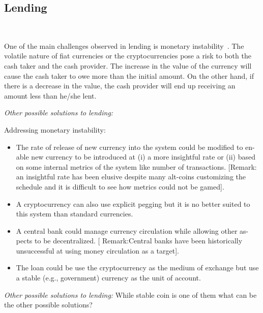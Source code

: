 \subsection{Lending}
~

One of the main challenges observed in lending is  monetary instability~\cite{okoyetoward}. The volatile nature of fiat currencies or the cryptocurrencies pose a risk to both the cash taker and the cash provider. The increase in the value of the currency will cause the cash taker to owe more than the initial amount. On the other hand, if there is a decrease in the value, the cash provider will end up receiving an amount less than he/she lent.



\textit{Other possible solutions to lending:} ~

Addressing monetary instability:
\begin{itemize}
	\item The rate of release of new currency into the system could be modified to en-
	able new currency to be introduced at (i) a more insightful rate or (ii) based
	on some internal metrics of the system like number of transactions. [Remark:
	an insightful rate has been elusive despite many alt-coins customizing the
	schedule and it is difficult to see how metrics could not be gamed].
	\item A cryptocurrency can also use explicit pegging but it is no better suited to this system than standard currencies.
	\item A central bank could manage currency circulation while allowing other as-
	pects to be decentralized. [	Remark:Central banks have been historically
	unsuccessful at using money circulation as a target].
	\item The loan could be use the cryptocurrency as the medium of exchange but
	use a stable (e.g.,	government) currency as the unit of account.
\end{itemize}

\textit{Other possible solutions to lending:} While stable coin is one of them what can be the other possible solutions?

